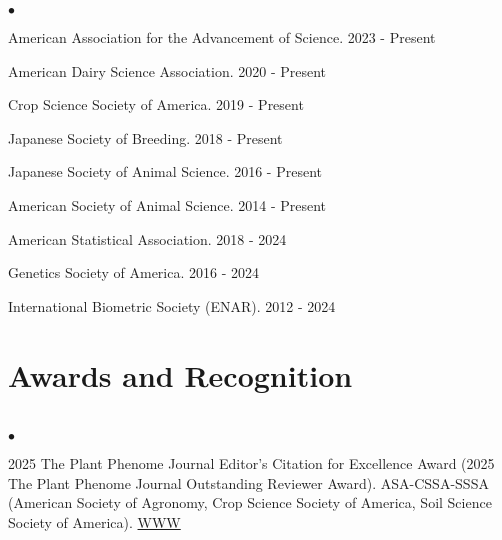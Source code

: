 \documentclass[margin,line,10pt]{res}
\newenvironment{list2}{
  \begin{list}{$\bullet$}{%
      \setlength{\itemsep}{0in}
      \setlength{\parsep}{0in} \setlength{\parskip}{0in}
      \setlength{\topsep}{0in} \setlength{\partopsep}{0in} 
      \setlength{\leftmargin}{0.2in}}}{\end{list}}
\begin{document}
\begin{resume}
\begin{list2}
  \item American Association for the Advancement of Science. 2023 - Present
  \vspace{0.3cm}
  \item American Dairy Science Association. 2020 - Present
    \vspace{0.3cm}
  \item Crop Science Society of America. 2019 - Present
    \vspace{0.3cm}
  \item  Japanese Society of Breeding. 2018 - Present
      \vspace{0.3cm}
\item  Japanese Society of Animal Science. 2016 - Present
  \vspace{0.3cm}
\item American Society of Animal Science. 2014 - Present
    \vspace{0.3cm}
        \item American Statistical Association. 2018 - 2024
        \vspace{0.3cm}
\item  Genetics Society of America. 2016 - 2024
    \vspace{0.3cm}
\item International Biometric Society (ENAR). 2012 - 2024
\end{list2}


\vspace{0.5cm}
\section{\sc Awards and Recognition}
\vspace{1cm}

\section{}
\begin{list2}
  \item 2025 The Plant Phenome Journal Editor's Citation for Excellence Award (2025 The Plant Phenome Journal Outstanding Reviewer Award). ASA-CSSA-SSSA (American Society of Agronomy, Crop Science Society of America, Soil Science Society of America). \textcolor{blue}{\href{https://www.sciencesocieties.org/publications/csa-news/2025/june/2025-journal-outstanding-editors-reviewers?q=publications/csa-news/2025/june/2025-journal-outstanding-editors-reviewers/}{WWW}}
\end{list2}


\end{resume}
\end{document}
